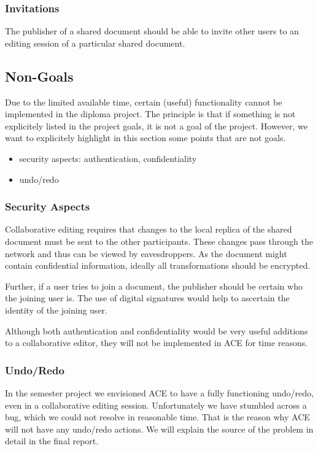 \documentclass[11pt,a4paper]{article}
\begin{document}
\subsubsection{Invitations}
The publisher of a shared document should be able to invite other users to an 
editing session of a particular shared document.

\subsection{Non-Goals}

Due to the limited available time, certain (useful) functionality cannot be 
implemented in the diploma project. The principle is that if something is not
explicitely listed in the project goals, it is not a goal of the project. 
However, we want to explicitely highlight in this section some points that are 
not goals.

\begin{itemize}
 \item security aspects: authentication, confidentiality
 \item undo/redo
\end{itemize}

\subsubsection{Security Aspects}
Collaborative editing requires that changes to the local replica of the shared 
document must be sent to the other participants. These changes pass through
the network and thus can be viewed by eavesdroppers. As the document might 
contain confidential information, ideally all transformations 
should be encrypted.

Further, if a user tries to join a document, the publisher should be certain 
who the joining user is. The use of digital signatures would help to 
ascertain the identity of the joining user.

Although both authentication and confidentiality would be very useful additions
to a collaborative editor, they will not be implemented in ACE for time 
reasons.

\subsubsection{Undo/Redo}
In the semester project we envisioned ACE to have a fully functioning 
undo/redo, even in a collaborative editing session. Unfortunately we have 
stumbled across a bug, which we could not resolve in reasonable time. That is 
the reason why ACE will not have any undo/redo actions. We will explain the 
source of the problem in detail in the final report. 
\end{document}
